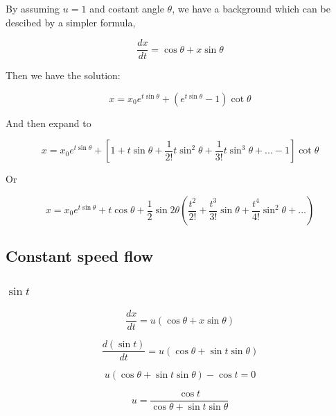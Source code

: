 \documentclass{article}
\begin{document}
By assuming $u = 1$ and costant angle $\theta$, we have a background which can be descibed by a simpler formula,

\begin{equation}
    \frac{dx}{dt} = \cos \theta + x \sin \theta
\end{equation}

Then we have the solution:

\begin{equation}
   x = x_0 e^{t \sin \theta} + (e^{t \sin \theta} - 1) \cot \theta
\end{equation}

And then expand to

\begin{equation}
   x =  x_0 e^{t \sin \theta} + [1 + t \sin \theta + \frac{1}{2!} t\sin^2 \theta  + \frac{1}{3!} t \sin^3 \theta + ... - 1] \cot \theta
\end{equation}

Or

\begin{equation}
   x =  x_0 e^{t \sin \theta} + t \cos \theta + \frac{1}{2} \sin 2\theta (\frac{t^2}{2!} + \frac{t^3}{3!} \sin \theta + \frac{t^4}{4!} \sin^2 \theta + ...)
\end{equation}

\newpage

\subsection{Constant speed flow}\label{sec:csflow}

\subsubsection{$\sin t$}

\begin{equation}
    \frac{dx}{dt} = u (\cos \theta + x \sin \theta)
\end{equation}

\begin{equation}
    \frac{d(\sin t)}{dt} = u(\cos \theta + \sin t \sin \theta)
\end{equation}

\begin{equation}
    u(\cos \theta + \sin t \sin \theta) - \cos t = 0
\end{equation}

\begin{equation}
    u = \frac{\cos t}{\cos \theta + \sin t \sin \theta}
\end{equation}
\end{document}
